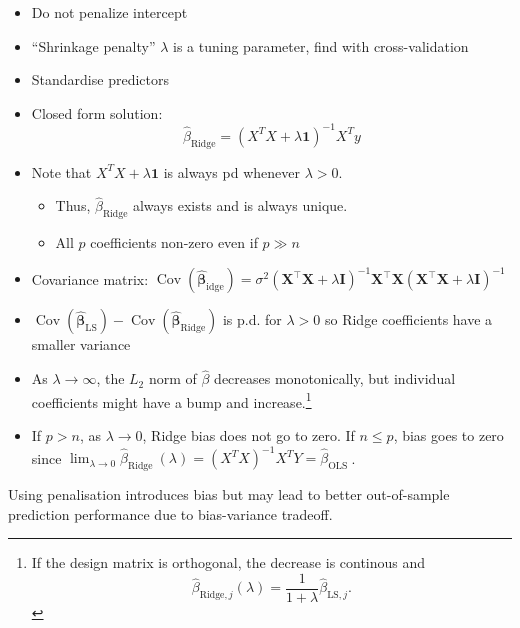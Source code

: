 \documentclass[11pt, %
	oneside, %
	english, %
	onehalfspacing, %
	]{article} %
\numberwithin{equation}{section}
\begin{document}
\begin{itemize}
    \item Do not penalize intercept
    \item ``Shrinkage penalty'' $\lambda$ is a tuning parameter, find with cross-validation
    \item Standardise predictors
    \item Closed form solution:
    \begin{equation*}
        \hat{\beta}_{\text{Ridge}} = (X^TX + \lambda \mathbf{1})^{-1} X^T y
    \end{equation*}
    \item Note that $X^TX + \lambda \mathbf{1}$ is always pd whenever $\lambda >0$.
    \begin{itemize}
        \item Thus, $\hat{\beta}_{\text{Ridge}}$ always exists and is always unique.
        \item All $p$ coefficients non-zero even if $p \gg n$
    \end{itemize}
    \item Covariance matrix: $\operatorname{Cov}\left(\hat{\mathbf{\beta}}_{\mathrm{idge}}\right)=\sigma^2\left(\mathbf{X}^\top \mathbf{X}+\lambda \mathbf{I}\right)^{-1} \mathbf{X}^\top \mathbf{X}\left(\mathbf{X}^\top \mathbf{X}+\lambda \mathbf{I}\right)^{-1}$
    \item $\operatorname{Cov}\left(\hat{\mathbf{\beta}}_{\mathrm{LS}}\right)-\operatorname{Cov}\left(\hat{\mathbf{\beta}}_{\mathrm{Ridge}}\right)$ is p.d. for $\lambda > 0$ so Ridge coefficients have a smaller variance
    \item As $\lambda \to \infty$, the $L_2$ norm of $\hat{\beta}$ decreases monotonically, but individual coefficients might have a bump and increase.\footnote{If the design matrix is orthogonal, the decrease is continous and
    \begin{equation*}
        \hat{\beta}_{\mathrm{Ridge}, j}(\lambda)=\frac{1}{1+\lambda} \hat{\beta}_{\mathrm{LS}, j} .
    \end{equation*}
    }
    \item If $p > n$, as $\lambda \to 0$, Ridge bias does not go to zero. If $n \leq p$, bias goes to zero since $\lim _{\lambda \rightarrow 0} \hat{\beta}_{\text {Ridge }}(\lambda)=\left(X^T X\right)^{-1} X^T Y=\hat{\beta}_{\text {OLS }}$.
\end{itemize}

Using penalisation introduces bias but may lead to better out-of-sample prediction performance due to bias-variance tradeoff.
\end{document}
